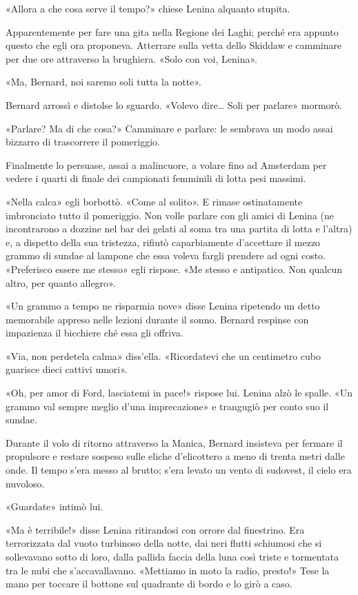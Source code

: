 \documentclass[
a5paper, %
10pt, %
twoside, 
onecolumn, %
openany, %
]{memoir}
\begin{document}
«Allora a che cosa serve il tempo?» chiese Lenina alquanto stupita.

Apparentemente per fare una gita nella Regione dei Laghi; perché era appunto questo che egli ora proponeva. Atterrare sulla vetta dello Skiddaw e camminare per due ore attraverso la brughiera. «Solo con voi, Lenina».

«Ma, Bernard, noi saremo soli tutta la notte».

Bernard arrossì e distolse lo sguardo. «Volevo dire… Soli per parlare» mormorò.

«Parlare? Ma di che cosa?» Camminare e parlare: le sembrava un modo assai bizzarro di trascorrere il pomeriggio.

Finalmente lo persuase, assai a malincuore, a volare fino ad Amsterdam per vedere i quarti di finale dei campionati femminili di lotta pesi massimi.

«Nella calca» egli borbottò. «Come al solito». E rimase ostinatamente imbronciato tutto il pomeriggio. Non volle parlare con gli amici di Lenina (ne incontrarono a dozzine nel bar dei gelati al soma tra una partita di lotta e l’altra) e, a dispetto della sua tristezza, rifiutò caparbiamente d’accettare il mezzo grammo di sundae al lampone che essa voleva fargli prendere ad ogni costo. «Preferisco essere me stesso» egli rispose. «Me stesso e antipatico. Non qualcun altro, per quanto allegro».

«Un grammo a tempo ne risparmia nove» disse Lenina ripetendo un detto memorabile appreso nelle lezioni durante il sonno. Bernard respinse con impazienza il bicchiere ché essa gli offriva.

«Via, non perdetela calma» diss’ella. «Ricordatevi che un centimetro cubo guarisce dieci cattivi umori».

«Oh, per amor di Ford, lasciatemi in pace!» rispose lui. Lenina alzò le spalle. «Un grammo val sempre meglio d’una imprecazione» e trangugiò per conto suo il sundae.

Durante il volo di ritorno attraverso la Manica, Bernard insisteva per fermare il propulsore e restare sospeso sulle eliche d’elicottero a meno di trenta metri dalle onde. Il tempo s’era messo al brutto; s’era levato un vento di sudovest, il cielo era nuvoloso.

«Guardate» intimò lui.

«Ma è terribile!» disse Lenina ritirandosi con orrore dal finestrino. Era terrorizzata dal vuoto turbinoso della notte, dai neri flutti schiumosi che si sollevavano sotto di loro, dalla pallida faccia della luna così triste e tormentata tra le nubi che s’accavallavano. «Mettiamo in moto la radio, presto!» Tese la mano per toccare il bottone sul quadrante di bordo e lo girò a caso.
\end{document}
